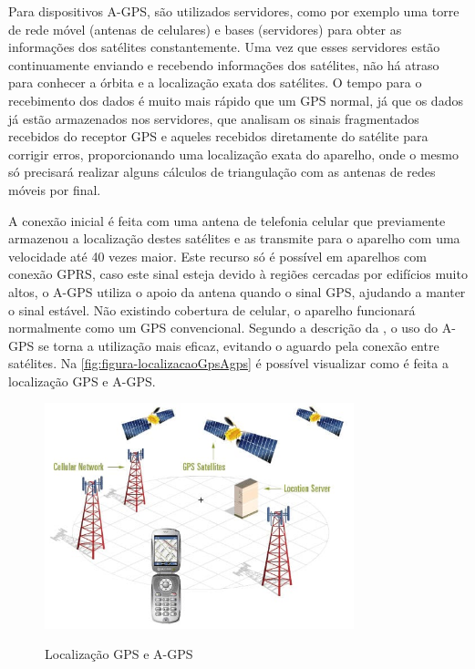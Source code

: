 Para dispositivos A-GPS, são utilizados servidores, como por exemplo uma torre de rede móvel (antenas de celulares) e bases (servidores) para obter as informações dos satélites constantemente. Uma vez que esses servidores estão continuamente enviando e recebendo informações dos satélites, não há atraso para conhecer a órbita e a localização exata dos satélites. O tempo para o recebimento dos dados é muito mais rápido que um GPS normal, já que os dados já estão armazenados nos servidores, que analisam os sinais fragmentados recebidos do receptor GPS e aqueles recebidos diretamente do satélite para corrigir erros, proporcionando uma localização exata do aparelho, onde o mesmo só precisará realizar alguns cálculos de triangulação com as antenas de redes móveis por final.

A conexão inicial é feita com uma antena de telefonia celular que previamente armazenou a localização destes satélites e as transmite para o aparelho com uma velocidade até 40 vezes maior. Este recurso só é possível em aparelhos com conexão GPRS, caso este sinal esteja devido à regiões cercadas por edifícios muito altos, o A-GPS utiliza o apoio da antena quando o sinal GPS, ajudando a manter o sinal estável. Não existindo cobertura de celular, o aparelho funcionará normalmente como um GPS convencional. Segundo a descrição da , o uso do A-GPS se torna a utilização mais eficaz, evitando o aguardo pela conexão entre satélites. Na \autoref{fig:figura-localizacaoGpsAgps} é possível visualizar como é feita a localização GPS e A-GPS.

\begin{figure}[H]
    \centering
    \caption{Localização GPS e A-GPS}
    \includegraphics[width=0.8\textwidth]{./dados/figuras/fig5}
    \label{fig:figura-localizacaoGpsAgps}
\end{figure}

